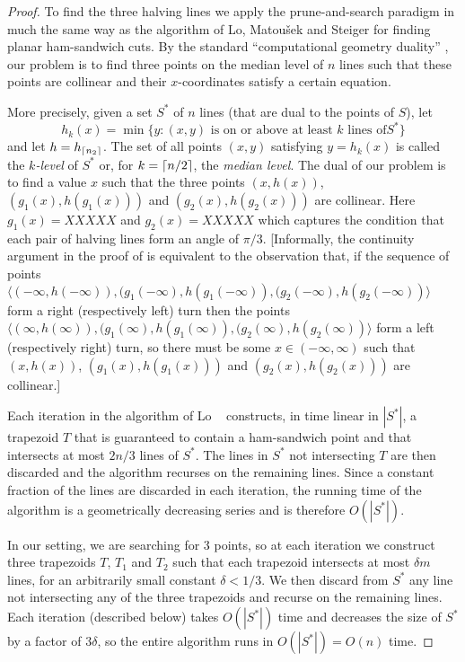 \documentclass[lotsofwhite]{patmorin}
\newcommand{\blau}{XXXXX}
\newcommand{\bleu}{XXXXX}
\begin{document}
\begin{proof}

To find the three halving lines we apply the prune-and-search paradigm
in much the same way as the algorithm of Lo, Matou\v{s}ek and Steiger
\cite{lms94} for finding planar ham-sandwich cuts.  By the standard
``computational geometry duality'' \cite[Section~1.3.3]{bkoo97}, our problem
is to find three points on the median level of $n$ lines such that
these points are collinear and their $x$-coordinates satisfy a certain
equation.  

More precisely, given a set $S^*$ of $n$ lines (that are dual to the
points of $S$), let
\[
    h_k(x) = \min\{ y : 
        \mbox{$(x,y)$ is on or above at least $k$ lines of
$S^*$}\} 
\]
and let $h=h_{\left\lceil n_2 \right\rceil}$.  The set of all points $(x,y)$ satisfying
$y=h_k(x)$ is called the \emph{$k$-level} of $S^*$ or, for
$k=\left\lceil n/2 \right\rceil$, the \emph{median level}.
The dual of our problem is to find a value $x$ such that the three points
$(x,h(x))$, $(g_1(x),h(g_1(x)))$ and $(g_2(x),h(g_2(x)))$ are collinear.
Here $g_1(x)=\blau$ and
$g_2(x)=\bleu$ which captures the condition that each pair of halving
lines form an angle of $\pi/3$.  [Informally, the continuity argument in
the proof of  is equivalent to the observation
that, if the sequence of points $\langle(-\infty,h(-\infty)),
(g_1(-\infty),h(g_1(-\infty)), (g_2(-\infty),h(g_2(-\infty))\rangle$ form
a right (respectively left) turn then the points $\langle(\infty,h(\infty)),
(g_1(\infty),h(g_1(\infty)), (g_2(\infty),h(g_2(\infty))\rangle$ form a
left (respectively right) turn, so there must be some
$x\in(-\infty,\infty)$ such that 
$(x,h(x))$, $(g_1(x),h(g_1(x)))$ and $(g_2(x),h(g_2(x)))$ are
collinear.]

Each iteration in the algorithm of Lo \etal\ \cite{lms94} constructs,
in time linear in $|S^*|$, a trapezoid $T$ that is guaranteed to
contain a ham-sandwich point and that intersects at most $2n/3$ lines
of $S^*$.  The lines in $S^*$ not intersecting $T$ are then discarded
and the algorithm recurses on the remaining lines.  Since a constant
fraction of the lines are discarded in each iteration, the running
time of the algorithm is a geometrically decreasing series and is
therefore $O(|S^*|)$.

In our setting, we are searching for 3 points, so at each iteration we
construct three trapezoids $T$, $T_1$ and $T_2$ such that each
trapezoid intersects at most $\delta m$ lines, for an arbitrarily
small constant $\delta < 1/3$.  We then discard from $S^*$ any line
not intersecting any of the three trapezoids and recurse on the
remaining lines.  Each iteration (described below) takes $O(|S^*|)$
time and decreases the size of $S^*$ by a factor of $3\delta$, so the
entire algorithm runs in $O(|S^*|)=O(n)$ time.


\end{proof}
\end{document}
